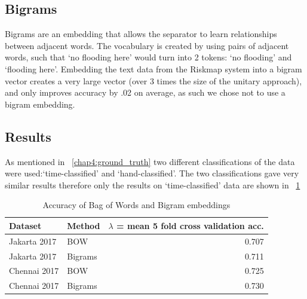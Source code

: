 \subsection{Bigrams}
Bigrams are an embedding that allows the separator to learn relationships
between adjacent words. The vocabulary is created by using pairs of adjacent
words, such that `no flooding here' would turn into 2 tokens: `no flooding' and
`flooding here'. Embedding the text data from the Riskmap system into a bigram
vector creates a very large vector (over 3 times the size of the unitary approach),
and only improves accuracy by .02 on average, as such we chose not to use a
bigram embedding.

\subsection{Results}
As mentioned in \sectionautorefname{}~\ref{chap4:ground_truth} two different
classifications of the data were used:`time-classified' and `hand-classified'.
The two classifications gave very similar results therefore only the
results on `time-classified' data are shown in
\tableautorefname{}~\ref{table:bow_bigram_acc}

\begin{table}[h]
	\centering
  \begin{tabular}{llr}
  \toprule
        Dataset &   Method &  $\lambda{}$ = mean 5 fold cross validation acc. \\
	\hline
   Jakarta 2017 &      BOW &                              0.707 \\
  \midrule
   Jakarta 2017 &  Bigrams &                              0.711 \\
   Chennai 2017 &      BOW &                              0.725 \\
   Chennai 2017 &  Bigrams &                              0.730 \\
  \bottomrule
  \end{tabular}
  \caption{Accuracy of Bag of Words and Bigram
  embeddings}\label{table:bow_bigram_acc}
\end{table}

